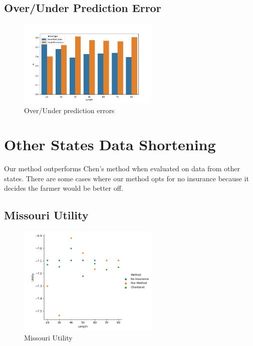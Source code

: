 \documentclass[11pt]{article}
\begin{document}
    \subsection{Over/Under Prediction Error}
        \begin{figure}[h]
            \centering
            \includegraphics[width=0.6\textwidth]{../../../output/figures/Evaluation/Illinois_over_under_pred_error.png}
            \caption{Over/Under prediction errors}
        \end{figure}
        \FloatBarrier

\section{Other States Data Shortening}
  Our method outperforms Chen's method when evaluated on data from other states. There are some cases where our method opts for no insurance because it decides the farmer would be better off.  
    \subsection{Missouri Utility}
        \begin{figure}[h]
            \centering
            \includegraphics[width=0.6\textwidth]{../../../output/figures/Evaluation 2/Missouri_Utility_Length_ml1.png}
            \caption{Missouri Utility}
        \end{figure}
        \FloatBarrier
\end{document}
